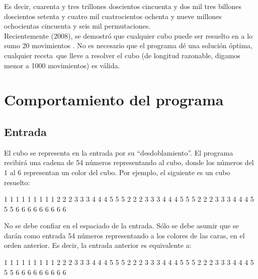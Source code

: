 \documentclass[11pt,a4paper]{article}
\begin{document}
Es decir, cuarenta y tres trillones doscientos cincuenta y dos mil tres billones doscientos setenta y cuatro mil cuatrocientos ochenta y nueve millones ochocientas cincuenta y seis mil permutaciones.\\

Recientemente (2008), se demostró que cualquier cubo puede ser resuelto en a lo sumo 20 movimientos \cite{movs}. No es necesario que el programa dé una solución óptima, cualquier receta\footnotemark  \, que lleve a resolver el cubo (de longitud razonable, digamos menor a 1000 movimientos) es válida.


\section{Comportamiento del programa}

\subsection{Entrada}
El cubo se representa en la entrada por su ``desdoblamiento''. El programa recibirá una cadena de 54 números representando al cubo, donde los números del 1 al 6 representan un color del cubo. Por ejemplo, el siguiente es un cubo resuelto: \\
\begin{center}
\begin{verbbox}
      1 1 1 
      1 1 1 
      1 1 1 
2 2 2 3 3 3 4 4 4 5 5 5 
2 2 2 3 3 3 4 4 4 5 5 5 
2 2 2 3 3 3 4 4 4 5 5 5
      6 6 6 
      6 6 6 
      6 6 6 
\end{verbbox}

\theverbbox
\end{center}

No se debe confiar en el espaciado de la entrada. Sólo se debe asumir que se darán como entrada 54 números representando a los colores de las caras, en el orden anterior. Es decir, la entrada anterior es equivalente a:

\begin{center}
\begin{verbbox}
1 1 1 1 1 1 1 1 1 2 2 2 3 3 3 4 4 4 5 5 5 2 2 2 3 3 3
4 4 4 5 5 5 2 2 2 3 3 3 4 4 4 5 5 5 6 6 6 6 6 6 6 6 6 
\end{verbbox}

\theverbbox
\end{center}
\end{document}
